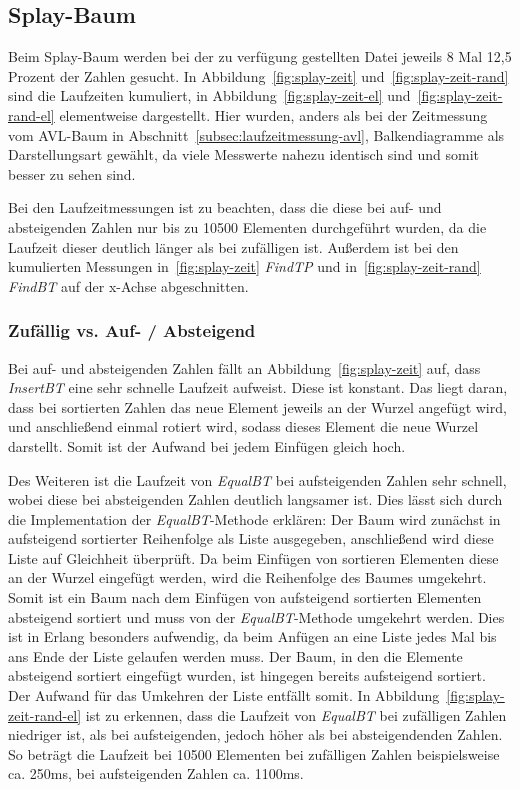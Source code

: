 \subsection{Splay-Baum}\label{subsec:splay-baum}
Beim Splay-Baum werden bei der zu verfügung gestellten Datei jeweils 8 Mal 12,5 Prozent der
Zahlen gesucht.
In Abbildung~\ref{fig:splay-zeit} und~\ref{fig:splay-zeit-rand} sind die Laufzeiten
kumuliert, in Abbildung~\ref{fig:splay-zeit-el} und~\ref{fig:splay-zeit-rand-el}
elementweise dargestellt.
Hier wurden, anders als bei der Zeitmessung vom AVL-Baum in
Abschnitt~\ref{subsec:laufzeitmessung-avl}, Balkendiagramme als Darstellungsart gewählt, da viele
Messwerte nahezu identisch sind und somit besser zu sehen sind.

Bei den Laufzeitmessungen ist zu beachten, dass die diese bei auf- und absteigenden
Zahlen nur bis zu 10500 Elementen durchgeführt wurden, da die Laufzeit dieser deutlich
länger als bei zufälligen ist.
Außerdem ist bei den kumulierten Messungen in~\ref{fig:splay-zeit} \textit{FindTP} und
in~\ref{fig:splay-zeit-rand} \textit{FindBT} auf der x-Achse abgeschnitten.

\subsubsection{Zufällig vs. Auf- / Absteigend}
Bei auf- und absteigenden Zahlen fällt an Abbildung~\ref{fig:splay-zeit} auf, dass \textit{InsertBT}
eine sehr schnelle Laufzeit aufweist.
Diese ist konstant.
Das liegt daran, dass bei sortierten Zahlen das neue Element jeweils an
der Wurzel angefügt wird, und anschließend einmal rotiert wird, sodass dieses Element die
neue Wurzel darstellt.
Somit ist der Aufwand bei jedem Einfügen gleich hoch.

Des Weiteren ist die Laufzeit von \textit{EqualBT} bei aufsteigenden Zahlen sehr schnell,
wobei diese bei absteigenden Zahlen deutlich langsamer ist.
Dies lässt sich durch die Implementation der \textit{EqualBT}-Methode erklären:
Der Baum wird zunächst in aufsteigend sortierter Reihenfolge als Liste ausgegeben,
anschließend wird diese Liste auf Gleichheit überprüft.
Da beim Einfügen von sortieren Elementen diese an der Wurzel eingefügt werden, wird die
Reihenfolge des Baumes umgekehrt.
Somit ist ein Baum nach dem Einfügen von aufsteigend sortierten Elementen absteigend sortiert
und muss von der \textit{EqualBT}-Methode umgekehrt werden.
Dies ist in Erlang besonders aufwendig, da beim Anfügen an eine Liste jedes Mal bis ans Ende
der Liste gelaufen werden muss.
Der Baum, in den die Elemente absteigend sortiert eingefügt wurden, ist hingegen bereits
aufsteigend sortiert.
Der Aufwand für das Umkehren der Liste entfällt somit.
In Abbildung~\ref{fig:splay-zeit-rand-el} ist zu erkennen, dass die
Laufzeit von \textit{EqualBT} bei zufälligen Zahlen niedriger ist,
als bei aufsteigenden, jedoch höher als bei absteigendenden Zahlen.
So beträgt die Laufzeit bei 10500 Elementen bei zufälligen Zahlen beispielsweise ca. 250ms,
bei aufsteigenden Zahlen ca. 1100ms.


